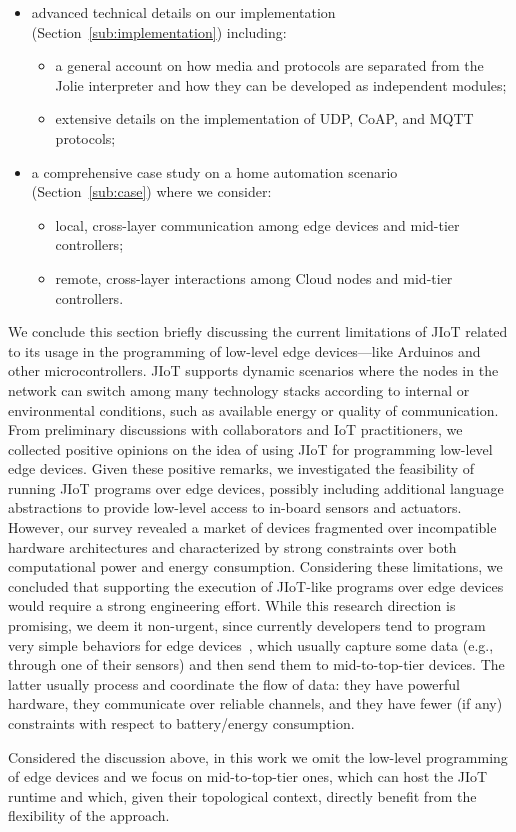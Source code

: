 \begin{itemize}
 \item advanced technical details on our implementation (Section~\ref{sub:implementation}) including:

       \begin{itemize}
        \item a general account on how media and protocols are separated from the
              Jolie interpreter and how they can be developed as independent modules;

        \item extensive details on the implementation of UDP, CoAP, and MQTT
              protocols;

       \end{itemize}

 \item a comprehensive case study on a home automation scenario (Section~\ref{sub:case}) where we
       consider:

       \begin{itemize}

        \item local, cross-layer communication among edge devices and
              mid-tier controllers;

        \item remote, cross-layer interactions among Cloud nodes and mid-tier
              controllers.

       \end{itemize}

\end{itemize}
%
We conclude this section briefly discussing the current limitations of JIoT
related to its usage in the programming of low-level edge devices---like
Arduinos and other microcontrollers. JIoT supports dynamic scenarios where the
nodes in the network can switch among many technology stacks according to
internal or environmental conditions, such as available energy or quality of
communication. From preliminary discussions with collaborators and IoT
practitioners, we collected positive opinions on the idea of using JIoT for
programming low-level edge devices. Given these positive remarks, we
investigated the feasibility of running JIoT programs over edge devices,
possibly including additional language abstractions to provide low-level access
to in-board sensors and actuators. However, our survey revealed a market of
devices fragmented over incompatible hardware architectures and characterized
by strong constraints over both computational power and energy consumption.
Considering these limitations, we concluded that supporting the execution of
JIoT-like programs over edge devices would require a strong engineering effort.
While this research direction is promising, we deem it non-urgent, since
currently developers tend to program very simple behaviors for edge
devices~\cite{7123563}, which usually capture some data (e.g., through one of
their sensors) and then send them to mid-to-top-tier devices. The latter
usually process and coordinate the flow of data: they have powerful hardware,
they communicate over reliable channels, and they have fewer (if any)
constraints with respect to battery/energy consumption. 

Considered the discussion above, in this work we omit the low-level programming
of edge devices and we focus on mid-to-top-tier ones, which can host the JIoT
runtime and which, given their topological context, directly benefit from the
flexibility of the approach.
